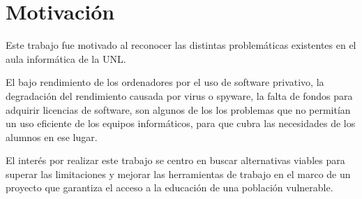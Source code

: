 \chapter{Motivación}\label{ch:motivación}

    Este trabajo fue motivado al reconocer las distintas problemáticas existentes en
    el aula informática de la UNL.\par
    El bajo rendimiento de los ordenadores por el uso de software privativo, la 
    degradación del rendimiento causada por virus o spyware, la falta de fondos para 
    adquirir licencias de software, son algunos de los los problemas que no permitían 
    un uso eficiente de los equipos informáticos, para que cubra las necesidades de 
    los alumnos en ese lugar.\par

    El interés por realizar este trabajo se centro en buscar alternativas viables 
    para superar las limitaciones y mejorar las herramientas de trabajo en el 
    marco de un proyecto que garantiza el acceso a la educación de una población 
    vulnerable.\par


